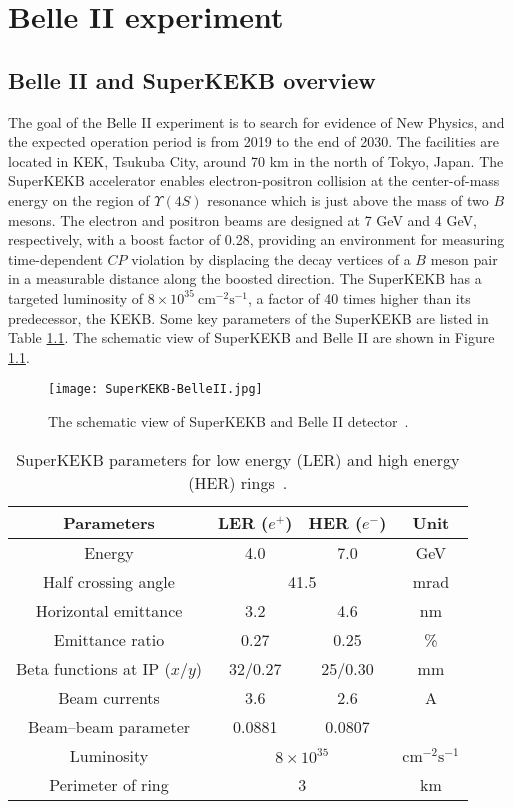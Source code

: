 \chapter{Belle II experiment}
\section{Belle II and SuperKEKB overview}
The goal of the Belle II experiment is to search for evidence of New Physics, and the expected operation period is from 2019 to the end of 2030. The facilities are located in KEK, Tsukuba City, around 70 km in the north of Tokyo, Japan. The SuperKEKB accelerator enables electron-positron collision at the center-of-mass energy on the region of $\Upsilon(4S)$ resonance which is just above the mass of two $B$ mesons. The electron and positron beams are designed at 7 GeV and 4 GeV, respectively, with a boost factor of 0.28, providing an environment for measuring time-dependent $CP$ violation by displacing the decay vertices of a $B$ meson pair in a measurable distance along the boosted direction. The SuperKEKB has a targeted luminosity of $8\times 10^{35}\: \text{cm}^{-2} \text{s}^{-1}$, a factor of 40 times higher than its predecessor, the KEKB.  Some key parameters of the SuperKEKB are listed in Table \ref{tab:superkekb_pars}. The schematic view of SuperKEKB and Belle II are shown in Figure \ref{fig:superkekb_belle2}.

\begin{figure}
	\centering 
	\texttt{[image: SuperKEKB-BelleII.jpg]}
	\caption{The schematic view of SuperKEKB and Belle II detector~\cite{Abe:2010gxa}.}
	\label{fig:superkekb_belle2}
\end{figure}

\begin{table}[H]
	\centering
	\large
	\caption{SuperKEKB parameters for low energy (LER) and high energy (HER) rings~\cite{b2book}.}
	\label{tab:superkekb_pars}
	\begin{tabular}{c c c c}
		\toprule
		
		Parameters & LER ($e^+$) & HER ($e^-$) & Unit\\
		\hline
		Energy & 4.0 & 7.0 & GeV\\
		Half crossing angle & \multicolumn{2}{c}{41.5} & mrad\\
		Horizontal emittance & 3.2 & 4.6 & nm \\
		Emittance ratio & 0.27 & 0.25 & \%\\
		Beta functions at IP ($x$/$y$) & 32/0.27 & 25/0.30 & mm\\
		Beam currents & 3.6 & 2.6 &  A \\
		Beam–beam parameter & 0.0881 & 0.0807 & {}\\
		Luminosity & \multicolumn{2}{c}{$8\times 10^{35}$} &  $\text{cm}^{-2} \text{s}^{-1}$\\
		Perimeter of ring & \multicolumn{2}{c}{3} & km\\
		
		\bottomrule
	\end{tabular}
\end{table}


